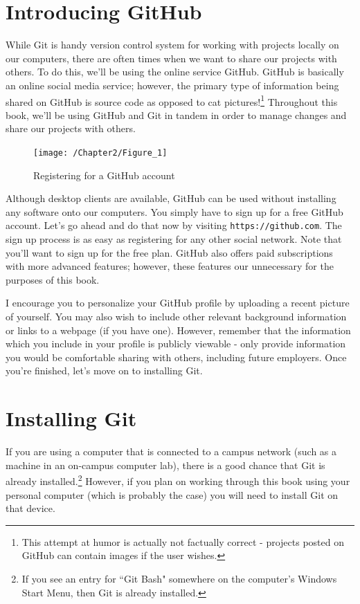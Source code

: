 \documentclass{book}
\begin{document}
\section{Introducing GitHub}

While Git is handy version control system for working with projects locally on our computers, there are often times when we want to share our projects with others. To do this, we'll be using the online service GitHub\texttrademark. GitHub is basically an online social media service; however, the primary type of information being shared on GitHub is source code as opposed to cat pictures!\footnote{This attempt at humor is actually not factually correct - projects posted on GitHub can contain images if the user wishes.} Throughout this book, we'll be using GitHub and Git in tandem in order to manage changes and share our projects with others.

\begin{figure}[h]
	\caption{Registering for a GitHub account}
	\centering\texttt{[image: /Chapter2/Figure\_1]}
\end{figure}

Although desktop clients are available, GitHub can be used without installing any software onto our computers. You simply have to sign up for a free GitHub account. Let's go ahead and do that now by visiting \texttt{https://github.com}. The sign up process is as easy as registering for any other social network. Note that you'll want to sign up for the free plan. GitHub also offers paid subscriptions with more advanced features; however, these features our unnecessary for the purposes of this book.

I encourage you to personalize your GitHub profile by uploading a recent picture of yourself. You may also wish to include  other relevant background information  or links to a webpage (if you have one). However, remember that the information which you include in your profile is publicly viewable - only provide information you would be comfortable sharing with others, including future employers. Once you're finished, let's move on to installing Git.

\section{Installing Git}

If you are using a computer that is connected to a campus network (such as a machine in an on-campus computer lab), there is a good chance that Git is already installed.\footnote{If you see an entry for ``Git Bash" somewhere on the computer's Windows Start Menu, then Git is already installed.} However, if you plan on working through this book using your personal computer (which is probably the case) you will need to install Git on that device.
\end{document}
